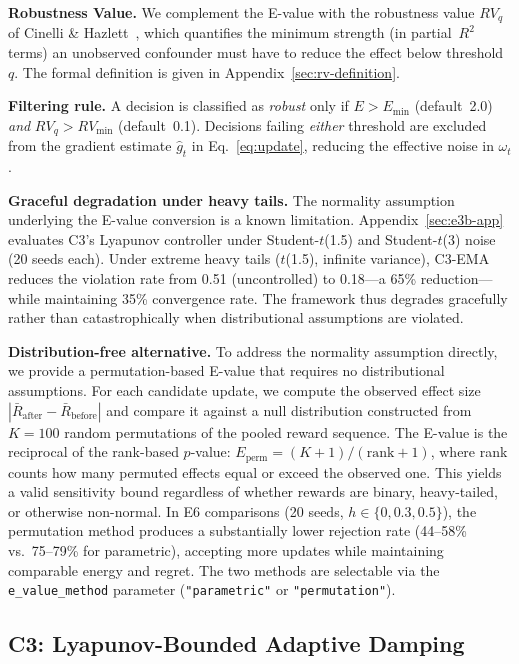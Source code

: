\documentclass{article}
\begin{document}
\textbf{Robustness Value.} We complement the E-value with the
robustness value $RV_q$ of Cinelli \& Hazlett~\cite{cinelli2020},
which quantifies the minimum strength (in partial~$R^2$ terms) an
unobserved confounder must have to reduce the effect below
threshold~$q$. The formal definition is given in
Appendix~\ref{sec:rv-definition}.

\textbf{Filtering rule.} A decision is classified as \emph{robust}
only if $E > E_{\min}$ (default~2.0) \emph{and} $RV_q > RV_{\min}$
(default~0.1). Decisions failing \emph{either} threshold are
excluded from the gradient estimate $\hat{g}_t$ in
Eq.~\eqref{eq:update}, reducing the effective noise in $\omega_t$.

\textbf{Graceful degradation under heavy tails.}
The normality assumption underlying the E-value conversion is a known limitation. Appendix~\ref{sec:e3b-app} evaluates C3's Lyapunov controller under Student-$t$(1.5) and Student-$t$(3) noise (20 seeds each). Under extreme heavy tails ($t$(1.5), infinite variance), C3-EMA reduces the violation rate from 0.51 (uncontrolled) to 0.18---a 65\% reduction---while maintaining 35\% convergence rate. The framework thus degrades gracefully rather than catastrophically when distributional assumptions are violated.

\textbf{Distribution-free alternative.}
To address the normality assumption directly, we provide a permutation-based E-value that requires no distributional assumptions. For each candidate update, we compute the observed effect size $|\bar{R}_{\text{after}} - \bar{R}_{\text{before}}|$ and compare it against a null distribution constructed from $K{=}100$ random permutations of the pooled reward sequence. The E-value is the reciprocal of the rank-based $p$-value: $E_{\text{perm}} = (K+1) / (\text{rank} + 1)$, where rank counts how many permuted effects equal or exceed the observed one. This yields a valid sensitivity bound regardless of whether rewards are binary, heavy-tailed, or otherwise non-normal. In E6 comparisons (20 seeds, $h \in \{0, 0.3, 0.5\}$), the permutation method produces a substantially lower rejection rate (44--58\% vs.\ 75--79\% for parametric), accepting more updates while maintaining comparable energy and regret. The two methods are selectable via the \texttt{e\_value\_method} parameter (\texttt{"parametric"} or \texttt{"permutation"}).


\subsection{C3: Lyapunov-Bounded Adaptive Damping}
\label{sec:lyapunov}
\end{document}
